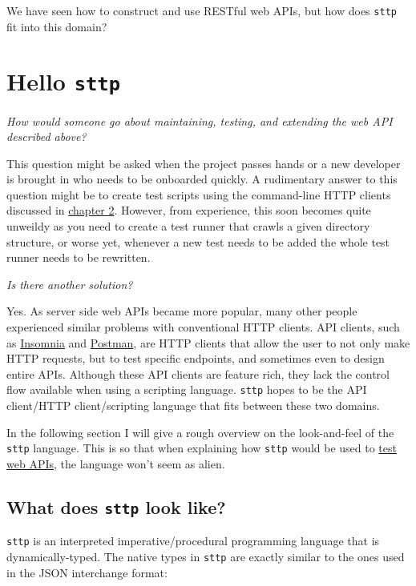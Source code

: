 \documentclass[]{full}
\theoremstyle{definition}
\begin{document}
We have seen how to construct and use RESTful web APIs, but how does \verb|sttp| fit into this domain?

\cprotect\chapter{Hello \verb|sttp|}

\begin{center}
    \textit{How would someone go about maintaining, testing, and extending the web API described above?}
\end{center}

This question might be asked when the project passes hands or a new developer is brought in who needs to be onboarded quickly. A rudimentary answer to this question might be to create test scripts using the command-line HTTP clients discussed in \hyperref[sec:meet-sttp-http-clients]{chapter 2}. However, from experience, this soon becomes quite unweildy as you need to create a test runner that crawls a given directory structure, or worse yet, whenever a new test needs to be added the whole test runner needs to be rewritten.

\begin{center}
    \textit{Is there another solution?}
\end{center}

Yes. As server side web APIs became more popular, many other people experienced similar problems with conventional HTTP clients. API clients, such as \href{https://insomnia.rest/}{Insomnia} and \href{https://www.postman.com/}{Postman}, are HTTP clients that allow the user to not only make HTTP requests, but to test specific endpoints, and sometimes even to design entire APIs. Although these API clients are feature rich, they lack the control flow available when using a scripting language. \verb|sttp| hopes to be the API client/HTTP client/scripting language that fits between these two domains.

In the following section I will give a rough overview on the look-and-feel of the \verb|sttp| language. This is so that when explaining how \verb|sttp| would be used to \hyperref[sec:hello-sttp-using-sttp-to-test]{test web APIs}, the language won't seem as alien.

\cprotect\section{What does \verb|sttp| look like?}

\verb|sttp| is an interpreted imperative/procedural programming language that is dynamically-typed. The native types in \verb|sttp| are exactly similar to the ones used in the JSON interchange format:
\end{document}
